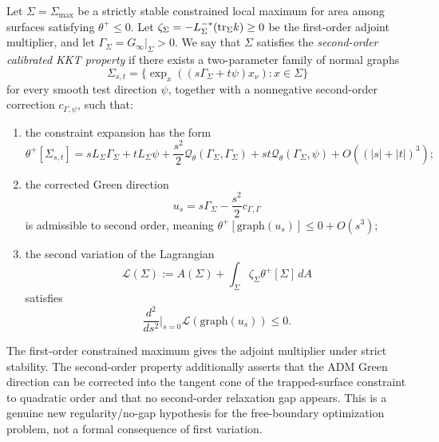 \begin{definition}\label{def:SecondOrderKKT37}
Let \(\Sigma=\Sigma_{\max}\) be a strictly stable constrained local maximum for area among surfaces satisfying \(\theta^+\le0\). Let \(\zeta_\Sigma=-L_\Sigma^{-*}(\mathrm{tr}_\Sigma k)\ge0\) be the first-order adjoint multiplier, and let \(\Gamma_\Sigma=G_\infty|_\Sigma>0\). We say that \(\Sigma\) satisfies the \emph{second-order calibrated KKT property} if there exists a two-parameter family of normal graphs
\[
    \Sigma_{s,t}=\{\exp_x((s\Gamma_\Sigma+t\psi)x_\nu):x\in\Sigma\}
\]
for every smooth test direction \(\psi\), together with a nonnegative second-order correction \(c_{\Gamma,\psi}\), such that:
\begin{enumerate}
    \item the constraint expansion has the form
    \[
        \theta^+[\Sigma_{s,t}]
        =
        sL_\Sigma\Gamma_\Sigma+tL_\Sigma\psi
        +\frac{s^2}{2}\mathcal Q_\theta(\Gamma_\Sigma,\Gamma_\Sigma)
        +st\mathcal Q_\theta(\Gamma_\Sigma,\psi)
        +O((|s|+|t|)^3);
    \]
    \item the corrected Green direction
    \[
        u_s=s\Gamma_\Sigma-\frac{s^2}{2}c_{\Gamma,\Gamma}
    \]
    is admissible to second order, meaning \(\theta^+[\mathrm{graph}(u_s)]\le0+O(s^3)\);
    \item the second variation of the Lagrangian
    \[
        \mathscr L(\Sigma)
        :=
        A(\Sigma)+\int_\Sigma \zeta_\Sigma\theta^+[\Sigma]\,dA
    \]
    satisfies
    \[
        \frac{d^2}{ds^2}\bigg|_{s=0}\mathscr L(\mathrm{graph}(u_s))\le0 .
    \]
\end{enumerate}
\end{definition}

\begin{remark}\label{rem:KKTNotAutomatic37}
The first-order constrained maximum gives the adjoint multiplier under strict stability. The second-order property additionally asserts that the ADM Green direction can be corrected into the tangent cone of the trapped-surface constraint to quadratic order and that no second-order relaxation gap appears. This is a genuine new regularity/no-gap hypothesis for the free-boundary optimization problem, not a formal consequence of first variation.
\end{remark}

